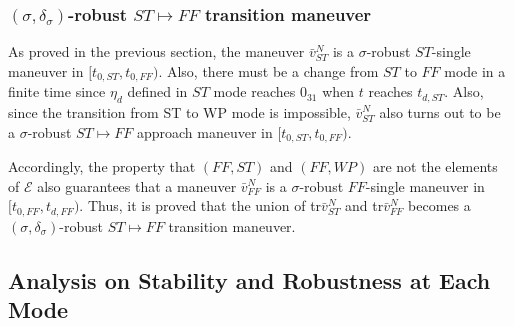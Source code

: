 \documentclass[letterpaper, 10 pt, conference]{ieeeconf}  %
\theoremstyle{definition}
\begin{document}
\subsubsection{$(\sigma, \delta_{\sigma})$-robust $ST \mapsto FF$ transition maneuver}
As proved in the previous section, the maneuver $\bar{v}^N_{ST}$ is a $\sigma$-robust $ST$-single maneuver in $[t_{0, ST}, t_{0, FF})$. Also, there must be a change from $ST$ to $FF$ mode in a finite time since $\eta_d$ defined in $ST$ mode reaches $0_{31}$ when $t$ reaches $t_{d, ST}$. Also, since the transition from ST to WP mode is impossible, $\bar{v}^N_{ST}$ also turns out to be a $\sigma$-robust $ST \mapsto FF$ approach maneuver in $[t_{0, ST}, t_{0, FF})$.

Accordingly, the property that $(FF, ST)$ and $(FF, WP)$ are not the elements of $\mathcal{E}$ also guarantees that a maneuver $\bar{v}^N_{FF}$ is a $\sigma$-robust $FF$-single maneuver in $[t_{0, FF}, t_{d, FF})$. Thus, it is proved   that the union of tr$\bar{v}^N_{ST}$ and tr$\bar{v}^N_{FF}$ becomes a $(\sigma, \delta_{\sigma})$-robust $ST \mapsto FF$ transition maneuver.

\subsection{Analysis on Stability and Robustness at Each Mode}
\end{document}
